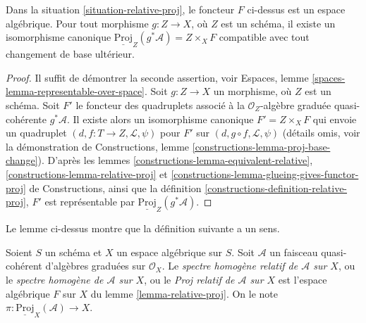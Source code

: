 \begin{lemma}
\label{lemma-relative-proj}
Dans la situation \ref{situation-relative-proj}, le foncteur $F$ ci-dessus est un
espace algébrique. Pour tout morphisme $g : Z \to X$, où $Z$ est un schéma,
il existe un isomorphisme canonique
$\underline{\text{Proj}}_Z(g^*\mathcal{A}) = Z \times_X F$
compatible avec tout changement de base ultérieur.
\end{lemma}

\begin{proof}
Il suffit de démontrer la seconde assertion, voir
Espaces, lemme \ref{spaces-lemma-representable-over-space}.
Soit $g : Z \to X$ un morphisme, où $Z$ est un schéma.
Soit $F'$ le foncteur des quadruplets associé
à la $\mathcal{O}_Z$-algèbre graduée quasi-cohérente $g^*\mathcal{A}$.
Il existe alors un isomorphisme canonique $F' = Z \times_X F$ qui envoie
un quadruplet $(d, f : T \to Z, \mathcal{L}, \psi)$ pour $F'$
sur $(d, g \circ f, \mathcal{L}, \psi)$ (détails omis, voir la démonstration de
Constructions, lemme \ref{constructions-lemma-proj-base-change}).
D'après les lemmes
\ref{constructions-lemma-equivalent-relative},
\ref{constructions-lemma-relative-proj} et
\ref{constructions-lemma-glueing-gives-functor-proj} de Constructions, ainsi que la
définition \ref{constructions-definition-relative-proj},
$F'$ est représentable par
$\underline{\text{Proj}}_Z(g^*\mathcal{A})$.
\end{proof}

\noindent
Le lemme ci-dessus montre que la définition suivante a un sens.

\begin{definition}
\label{definition-relative-proj}
Soient $S$ un schéma et $X$ un espace algébrique sur $S$.
Soit $\mathcal{A}$ un faisceau quasi-cohérent
d'algèbres graduées sur $\mathcal{O}_X$. Le
{\it spectre homogène relatif de $\mathcal{A}$ sur $X$},
ou le {\it spectre homogène de $\mathcal{A}$ sur $X$}, ou le
{\it Proj relatif de $\mathcal{A}$ sur $X$} est l'espace algébrique
$F$ sur $X$ du lemme \ref{lemma-relative-proj}.
On le note $\pi : \underline{\text{Proj}}_X(\mathcal{A}) \to X$.
\end{definition}

